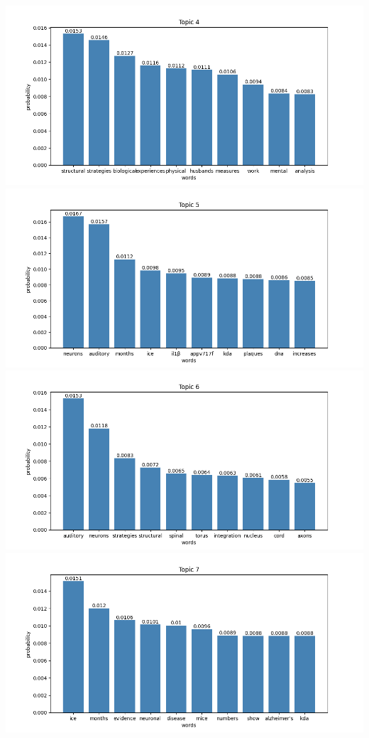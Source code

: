 \documentclass[10pt]{article} %
\begin{document}
\begin{center}
		\includegraphics[scale=0.6]{images/plots/test_8_no_stopwords/topic_4.png}
		\includegraphics[scale=0.6]{images/plots/test_8_no_stopwords/topic_5.png}
		\includegraphics[scale=0.6]{images/plots/test_8_no_stopwords/topic_6.png}
		\includegraphics[scale=0.6]{images/plots/test_8_no_stopwords/topic_7.png}
		
		
	\end{center}
\end{document}
